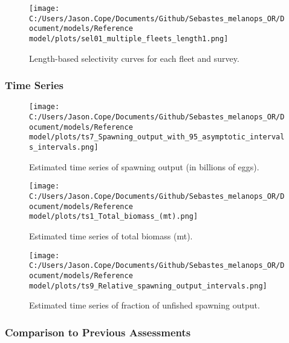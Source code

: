 \documentclass[11pt,
  letterpaper,
]{article}
\begin{document}
\begin{figure}
{\centering
\texttt{[image: C:/Users/Jason.Cope/Documents/Github/Sebastes\_melanops\_OR/Document/models/Reference model/plots/sel01\_multiple\_fleets\_length1.png]}
}
\caption{Length-based selectivity curves for each fleet and survey.\label{fig:fleet-selectivity}}
\end{figure}

\newpage

\hypertarget{time-series}{%
\subsubsection{Time Series}\label{time-series}}

\begin{figure}
{\centering
\texttt{[image: C:/Users/Jason.Cope/Documents/Github/Sebastes\_melanops\_OR/Document/models/Reference model/plots/ts7\_Spawning\_output\_with\_95\_asymptotic\_intervals\_intervals.png]}
}
\caption{Estimated time series of spawning output (in billions of eggs).\label{fig:ssb}}
\end{figure}

\newpage

\begin{figure}
{\centering
\texttt{[image: C:/Users/Jason.Cope/Documents/Github/Sebastes\_melanops\_OR/Document/models/Reference model/plots/ts1\_Total\_biomass\_(mt).png]}
}
\caption{Estimated time series of total biomass (mt).\label{fig:tot-bio}}
\end{figure}

\newpage

\begin{figure}
{\centering
\texttt{[image: C:/Users/Jason.Cope/Documents/Github/Sebastes\_melanops\_OR/Document/models/Reference model/plots/ts9\_Relative\_spawning\_output\_intervals.png]}
}
\caption{Estimated time series of fraction of unfished spawning output.\label{fig:depl}}
\end{figure}

\newpage

\hypertarget{comparison-to-previous-assessments}{%
\subsubsection{Comparison to Previous Assessments}\label{comparison-to-previous-assessments}}
\end{document}
